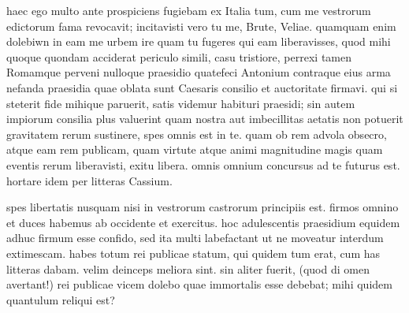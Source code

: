  haec ego multo ante prospiciens fugiebam ex Italia tum, cum me vestrorum edictorum fama revocavit; incitavisti vero tu me, Brute, Veliae. quamquam enim dolebiwn in eam me urbem ire quam tu fugeres qui eam liberavisses, quod mihi quoque quondam acciderat periculo simili, casu tristiore, perrexi tamen Romamque perveni nulloque praesidio quatefeci Antonium contraque eius arma nefanda praesidia quae oblata sunt Caesaris consilio et auctoritate firmavi. qui si steterit fide mihique paruerit, satis videmur habituri praesidi; sin autem impiorum consilia plus valuerint quam nostra aut imbecillitas aetatis non potuerit gravitatem rerum sustinere, spes omnis est in te. quam ob rem advola obsecro, atque eam rem publicam, quam virtute atque animi magnitudine magis quam eventis rerum liberavisti, exitu libera. omnis omnium concursus ad te futurus est. hortare idem per litteras Cassium.

 spes libertatis nusquam nisi in vestrorum castrorum principiis est. firmos omnino et duces habemus ab occidente et exercitus. hoc adulescentis praesidium equidem adhuc firmum esse confido, sed ita multi labefactant ut ne moveatur interdum extimescam. habes totum rei publicae statum, qui quidem tum erat, cum has litteras dabam. velim deinceps meliora sint. sin aliter fuerit, (quod di omen avertant!) rei publicae vicem dolebo quae immortalis esse debebat; mihi quidem quantulum reliqui est?
